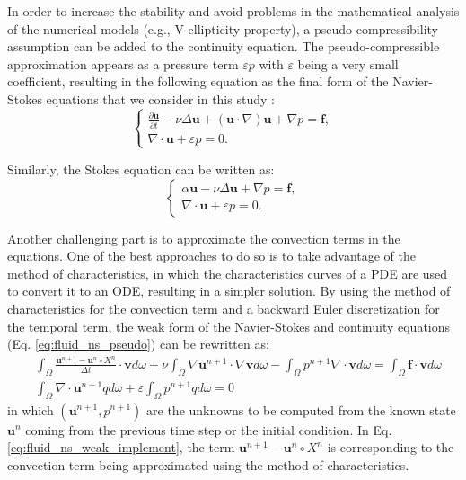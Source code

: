 In order to increase the stability and avoid problems in the mathematical analysis of the numerical models (e.g., V-ellipticity
property), a pseudo-compressibility assumption can be added to the continuity equation. The pseudo-compressible approximation appears as a pressure term $\varepsilon p$ with $\varepsilon$ being a very small coefficient, resulting in the following equation as the final form of the Navier-Stokes equations that we consider in this study \cite{devuyst2013}:
\begin{equation}  \label{eq:fluid_ns_pseudo}
\left\{ {\begin{array}{*{20}{l}}
\displaystyle  {\frac{{\partial {\mathbf{u}}}}{{\partial t}} - \nu\Delta{\mathbf{u}} + \left( {{\mathbf{u}} \cdot \nabla } \right) {\mathbf{u}} + \nabla p = {\mathbf{f}},} \\
 \displaystyle {\nabla\cdot{\mathbf{u}} + \varepsilon p = 0.}
\end{array}} \right.
\end{equation}

Similarly, the Stokes equation can be written as:
\begin{equation} \label{eq:fluid_stokes_pseudo}
\left\{ {\begin{array}{*{20}{l}}
\displaystyle  {\alpha \mathbf{u} - \nu\Delta \mathbf{u} + \nabla p = \mathbf{f},} \\
\displaystyle  {\nabla\cdot\mathbf{u} + \varepsilon p = 0.}
\end{array}} \right.
\end{equation}

Another challenging part is to approximate the convection terms in the equations. One of the best approaches to do so is to take advantage of the method of characteristics, in which the characteristics curves of a {PDE} are used to convert it to an {ODE}, resulting in a simpler solution. By using the method of characteristics for the convection term and a backward Euler discretization for the temporal term, the weak form of the Navier-Stokes and continuity equations (Eq. \ref{eq:fluid_ns_pseudo}) can be rewritten as:
\begin{equation} \label{eq:fluid_ns_weak_implement}
\begin{aligned}
&\int_{\Omega} \frac{\mathbf{u}^{n+1}-\mathbf{u}^{n} \circ X^{n}}{\Delta t} \cdot \mathbf{v} d \omega+\nu \int_{\Omega} \nabla \mathbf{u}^{n+1} \cdot \nabla \mathbf{v} d \omega-\int_{\Omega} p^{n+1} \nabla \cdot \mathbf{v} d \omega=\int_{\Omega} \mathbf{f} \cdot \mathbf{v} d\omega \\
&\int_{\Omega} \nabla \cdot \mathbf{u}^{n+1} q d \omega+\varepsilon \int_{\Omega} p^{n+1} q d \omega=0
\end{aligned}
\end{equation}
in which $(\mathbf{u}^{n+1},p^{n+1})$ are the unknowns to be computed from the known state $\mathbf{u}^{n}$ coming from the previous time step or the initial condition. In Eq. \ref{eq:fluid_ns_weak_implement}, the term $\mathbf{u}^{n+1}-\mathbf{u}^{n} \circ X^{n}$ is corresponding to the convection term being approximated using the method of characteristics.

